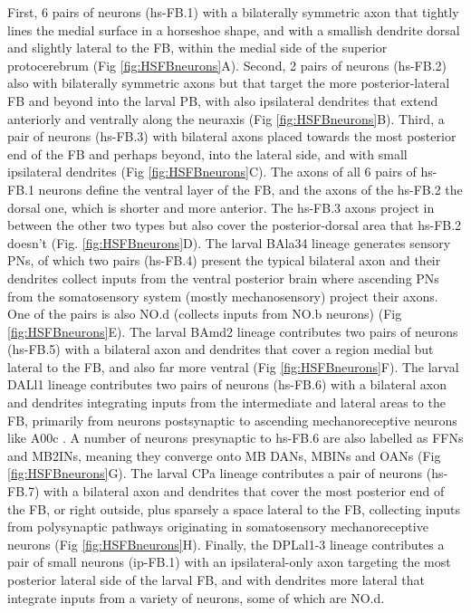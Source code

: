         First, 6 pairs of neurons (hs-FB.1) with a bilaterally symmetric axon that tightly lines the medial surface in a horseshoe shape, and with a smallish dendrite dorsal and slightly lateral to the FB, within the medial side of the superior protocerebrum (Fig \ref{fig:HSFBneurons}A). Second, 2 pairs of neurons (hs-FB.2) also with bilaterally symmetric axons but that target the more posterior-lateral FB and beyond into the larval PB, with also ipsilateral dendrites that extend anteriorly and ventrally along the neuraxis (Fig \ref{fig:HSFBneurons}B).
        Third, a pair of neurons (hs-FB.3) with bilateral axons placed towards the most posterior end of the FB and perhaps beyond, into the lateral side, and with small ipsilateral dendrites (Fig \ref{fig:HSFBneurons}C).
        The axons of all 6 pairs of hs-FB.1 neurons define the ventral layer of the FB, and the axons of the hs-FB.2 the dorsal one, which is shorter and more anterior. The hs-FB.3 axons project in between the other two types but also cover the posterior-dorsal area that hs-FB.2 doesn't (Fig. \ref{fig:HSFBneurons}D).  
        The larval BAla34 lineage generates sensory PNs, of which two pairs (hs-FB.4) present the typical bilateral axon and their dendrites collect inputs from the ventral posterior brain where ascending PNs from the somatosensory system (mostly mechanosensory) project their axons. One of the pairs is also NO.d (collects inputs from NO.b neurons) (Fig \ref{fig:HSFBneurons}E).
        The larval BAmd2 lineage contributes two pairs of neurons (hs-FB.5) with a bilateral axon and dendrites that cover a region medial but lateral to the FB, and also far more ventral (Fig \ref{fig:HSFBneurons}F).
        The larval DALl1 lineage contributes two pairs of neurons (hs-FB.6) with a bilateral axon and dendrites integrating inputs from the intermediate and lateral areas to the FB, primarily from neurons postsynaptic to ascending mechanoreceptive neurons like A00c \citep{ohyama2015multilevel}. A number of neurons presynaptic to hs-FB.6 are also labelled as FFNs and MB2INs, meaning they converge onto MB DANs, MBINs and OANs \citep{eschbach2020recurrent} (Fig \ref{fig:HSFBneurons}G).
        The larval CPa lineage contributes a pair of neurons (hs-FB.7) with a bilateral axon and dendrites that cover the most posterior end of the FB, or right outside, plus sparsely a space lateral to the FB, collecting inputs from polysynaptic pathways originating in somatosensory mechanoreceptive neurons  (Fig \ref{fig:HSFBneurons}H).
        Finally, the DPLal1-3 lineage contributes a pair of small neurons (ip-FB.1) with an ipsilateral-only axon targeting the most posterior lateral side of the larval FB, and with dendrites more lateral that integrate inputs from a variety of neurons, some of which are NO.d.

